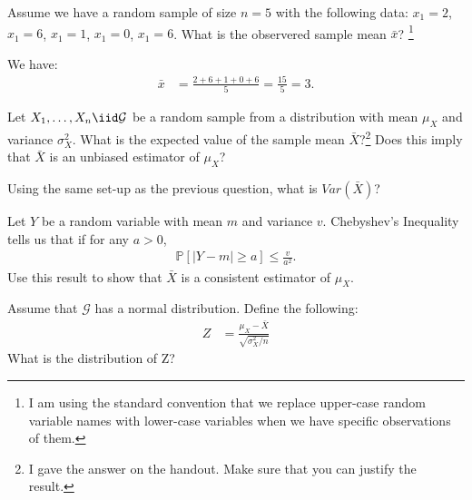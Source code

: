 
Assume we have a random sample of size $n = 5$ with the following data:
$x_1 = 2$, $x_1 = 6$, $x_1 = 1$, $x_1 = 0$, $x_1 = 6$. What is the observered
sample mean $\bar{x}$? 
\footnote{
  I am using the standard convention that we replace upper-case random 
  variable names with lower-case variables when we have specific 
  observations of them. 
}


We have:
\begin{align*}
\bar{x} &= \frac{2 + 6 + 1 + 0 + 6}{5} = \frac{15}{5} = 3.
\end{align*}


Let $X_1, \ldots, X_n \iid \mathcal{G}$ be a random sample from a distribution
with mean $\mu_X$ and variance $\sigma^2_X$. What is the expected value of the
sample mean $\bar{X}$?\footnote{
  I gave the answer on the handout. Make sure that you can justify
  the result.
} Does this imply that $\bar{X}$ is an unbiased estimator of $\mu_X$?




Using the same set-up as the previous question, what is $Var(\bar{X})$?




Let $Y$ be a random variable with mean $m$ and variance $v$. Chebyshev's
Inequality tells us that if for any $a > 0$,
\begin{align*}
\mathbb{P}[ |Y - m| \geq a] \leq \frac{v}{a^2}.
\end{align*}
Use this result to show that $\bar{X}$ is a consistent estimator of $\mu_X$.



Assume that $\mathcal{G}$ has a normal distribution. Define the following:
\begin{align*}
Z &= \frac{\mu_X - \bar{X}}{\sqrt{\sigma_X^2 / n}}
\end{align*}
What is the distribution of Z?



